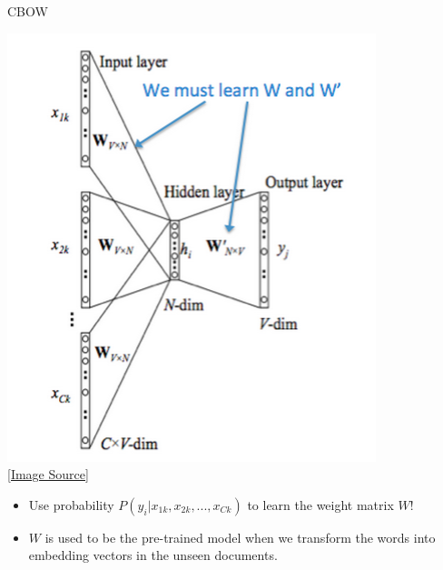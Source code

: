 \begin{frame}[fragile]{CBOW}

  \begin{center}
    \includegraphics[scale=0.3]{../images/img_5.png} \\  \href{https://web.stanford.edu/class/archive/cs/cs224n/cs224n.1214/readings/cs224n-2019-notes01-wordvecs1.pdf}{[Image Source]}
  \end{center}

  \begin{itemize}
    \item Use probability $P(y_{i} | x_{1k}, x_{2k}, ... , x_{Ck})$ to learn the weight matrix $W$!
    \item $W$ is used to be the pre-trained model when we transform the words into embedding vectors in the unseen documents.
  \end{itemize}

\end{frame}